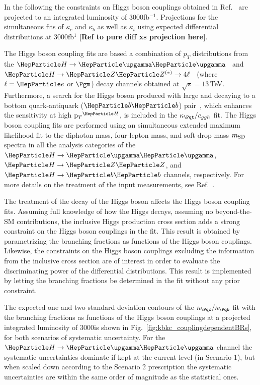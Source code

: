 \documentclass[../report.tex]{subfiles}
\begin{document}
In the following the constraints on Higgs boson couplings obtained in Ref.~\cite{CMS-PAS-HIG-17-028} are projected to an integrated luminosity of $3000$fb$^{-1}$.
% 
Projections for the simultaneous fits of $\kappa_c$ and $\kappa_b$ as well as $\kappa_t$  using expected differential distributions at $3000$fb$^{1}$  \textbf{[Ref to pure diff xs projection here]}.



The Higgs boson coupling fits are based a combination of $p_T$ distributions from the $\hgg$~\cite{Sirunyan:2018kta} and $\hzztofourl$~\cite{CMS_AN_2016-442} (where $\ell = \electron$ or $\muon$) decay channels obtained at $\sqrt{s}=13\,$TeV.
% 
Furthermore, a search for the Higgs boson produced with large \pt and decaying to a bottom quark-antiquark ($\bb$) pair~\cite{CMS_AN_2016-366}, which enhances the sensitivity at high $\pth$, is included in the $\kappat/\cg$ fit.
% 
The Higgs boson coupling fits are performed using an simultaneous extended maximum likelihood fit to the diphoton mass, four-lepton mass, and soft-drop mass $m_\text{SD}$~\cite{Dasgupta:2013ihk,Larkoski:2014wba} spectra in all the analysis categories of the $\hgg$, $\hzz$, and $\hbb$ channels, respectively.
% 
For more details on the treatment of the input measurements, see Ref.~\cite{CMS-PAS-HIG-17-028}.



The treatment of the decay of the Higgs boson affects the Higgs boson coupling fits.
% 
Assuming full knowledge of how the Higgs decays, \ie assuming no beyond-the-SM contributions, the inclusive Higgs production cross section adds a strong constraint on the Higgs boson couplings in the fit.
% 
This result is obtained by parametrizing the branching fractions as functions of the Higgs boson couplings.
% 
Likewise, the constraints on the Higgs boson couplings excluding the information from the inclusive cross section are of interest in order to evaluate the discriminating power of the differential distributions.
% 
This result is implemented by letting the branching fractions be determined in the fit without any prior constraint.



The expected one and two standard deviation contours of the $\kappac/\kappab$ fit with the branching fractions  as functions of the Higgs boson couplings at a projected integrated luminosity of $3000$\fbinv is shown in Fig.~\ref{fig:kbkc_couplingdependentBRs}, for both scenarios of systematic uncertainty.
% 
For the $\hgg$ channel the systematic uncertainties dominate if kept at the current level (\ie in Scenario 1), but when scaled down according to the Scenario 2 prescription the systematic uncertainties are within the same order of magnitude as the statistical ones.
\end{document}
